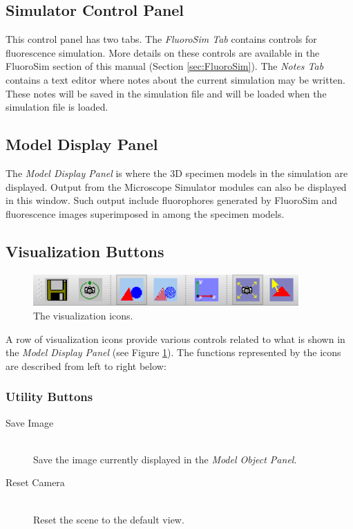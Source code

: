 \documentclass[11pt,titlepage]{article}
\begin{document}
\subsection{Simulator Control Panel}

This control panel has two tabs. The \emph{FluoroSim Tab} contains controls for fluorescence simulation. More details on these controls are available in the FluoroSim section of this manual (Section \ref{sec:FluoroSim}). The \emph{Notes Tab} contains a text editor where notes about the current simulation may be written. These notes will be saved in the simulation file and will be loaded when the simulation file is loaded.

\subsection{Model Display Panel}

The \emph{Model Display Panel} is where the 3D specimen models in the simulation are displayed. Output from the Microscope Simulator modules can also be displayed in this window. Such output include fluorophores generated by FluoroSim and fluorescence images superimposed in among the specimen models.

\subsection{Visualization Buttons}

\begin{figure}[htbp] %
   \centering
   \includegraphics[width=4in]{images/VisualizationIcons} 
   \caption{The visualization icons.}
   \label{fig:VisualizationIcons}
\end{figure}

A row of visualization icons provide various controls related to what is shown in the \emph{Model Display Panel} (see Figure \ref{fig:VisualizationIcons}). The functions represented by the icons are described from left to right below:

\subsubsection{Utility Buttons}

\begin{description}

  \item[Save Image] \hfill \\
  Save the image currently displayed in the \emph{Model Object Panel}.
  
  \item[Reset Camera] \hfill \\
  Reset the scene to the default view.
  
\end{description}
\end{document}
